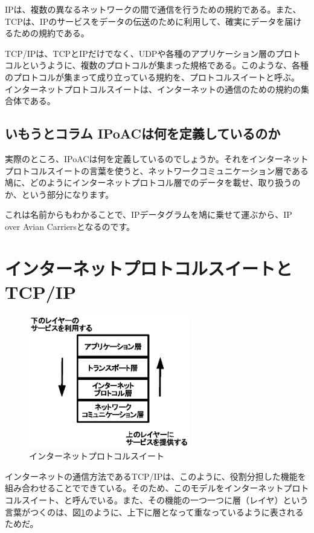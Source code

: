 IPは、複数の異なるネットワークの間で通信を行うための規約である。また、TCPは、IPのサービスをデータの伝送のために利用して、確実にデータを届けるための規約である。

TCP/IPは、TCPとIPだけでなく、UDPや各種のアプリケーション層のプロトコルというように、複数のプロトコルが集まった規格である。このような、各種のプロトコルが集まって成り立っている規約を、プロトコルスイートと呼ぶ。
インターネットプロトコルスイートは、インターネットの通信のための規約の集合体である。

\subsection*{いもうとコラム IPoACは何を定義しているのか}
実際のところ、IPoACは何を定義しているのでしょうか。それをインターネットプロトコルスイートの言葉を使うと、ネットワークコミュニケーション層である鳩に、どのようにインターネットプロトコル層でのデータを載せ、取り扱うのか、という部分になります。

これは名前からもわかることで、IPデータグラムを鳩に乗せて運ぶから、IP over Avian Carriersとなるのです。



\section{インターネットプロトコルスイートとTCP/IP}


\begin{figure}[htbp]
	\includegraphics[width=7cm,clip]{draw/stack.eps}
	\caption{インターネットプロトコルスイート}
	\label{fig:suite}
\end{figure}


インターネットの通信方法であるTCP/IPは、このように、役割分担した機能を組み合わせることでできている。そのため、このモデルをインターネットプロトコルスイート、と呼んでいる。また、その機能の一つ一つに層（レイヤ）という言葉がつくのは、図\ref{fig:suite}のように、上下に層となって重なっているように表されるためだ。


